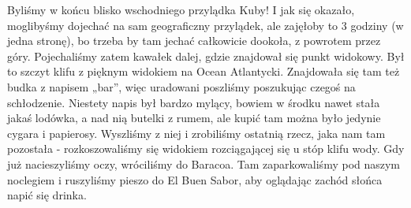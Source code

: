 Byliśmy w końcu blisko wschodniego przylądka Kuby!
I jak się okazało, moglibyśmy dojechać na sam geograficzny przylądek, ale zajęłoby to 3 godziny (w jedna stronę), bo trzeba by tam jechać całkowicie dookoła, z powrotem przez góry.
Pojechaliśmy zatem kawałek dalej, gdzie znajdował się punkt widokowy.
Był to szczyt klifu z pięknym widokiem na Ocean Atlantycki.
Znajdowała się tam też budka z napisem „bar”, więc uradowani poszliśmy poszukując czegoś na schłodzenie.
Niestety napis był bardzo mylący, bowiem w środku nawet stała jakaś lodówka, a nad nią butelki z rumem, ale kupić tam można było jedynie cygara i papierosy.
Wyszliśmy z niej i zrobiliśmy ostatnią rzecz, jaka nam tam pozostała - rozkoszowaliśmy się widokiem rozciągającej się u stóp klifu wody.
Gdy już nacieszyliśmy oczy, wróciliśmy do Baracoa.
Tam zaparkowaliśmy pod naszym noclegiem i ruszyliśmy pieszo do El Buen Sabor, aby oglądając zachód słońca napić się drinka.